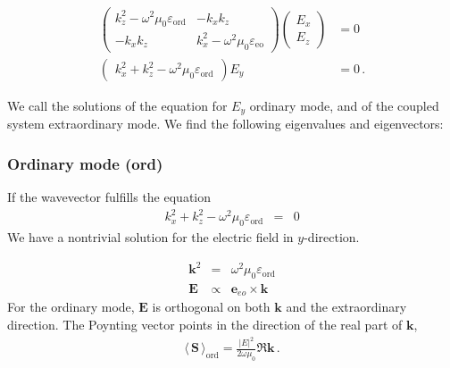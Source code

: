 \documentclass[12pt,a4paper,twoside,openright,BCOR10mm,headsepline,titlepage,abstracton,chapterprefix,final]{scrreprt}
\newcommand\Vector[1]{{\mathbf{#1}}}
\newcommand\vacuum{0}
\newcommand\wavenumber{k}
\newcommand\Wavevector{\Vector{\wavenumber}}
\newcommand\scalarEfield{E}
\newcommand\Efield{\Vector{\scalarEfield}}
\newcommand\vacuumpermeability{\scalarpermeability_{\vacuum}}
\newcommand\scalarpermeability{\mu}
\newcommand\scalarpermittivity{\varepsilon}
\newcommand\ordi{\text{ord}}
\newcommand\eo{\text{eo}}
\newcommand{\timeavg}[1]{{\langle\,#1\,\rangle}}
\begin{document}
\begin{subequations}
\begin{align}
\begin{pmatrix}
 \wavenumber_z^2 - \omega^2 \vacuumpermeability \scalarpermittivity_{\ordi} 
 &
 - \wavenumber_x \wavenumber_z 
 \\
 - \wavenumber_x \wavenumber_z 
 &
 \wavenumber_x^2 - \omega^2 \vacuumpermeability \scalarpermittivity_{\eo}  
\end{pmatrix} 
\begin{pmatrix}
 \scalarEfield_x 
 \\
 \scalarEfield_z
\end{pmatrix}
&= 0
\\
\begin{pmatrix} \wavenumber_x^2 + \wavenumber_z^2 - \omega^2 \vacuumpermeability \scalarpermittivity_{\ordi} \end{pmatrix} \scalarEfield_y &= 0\,.
\end{align}
\end{subequations}

We call the solutions of the equation for $\scalarEfield_y$ ordinary mode, and of the coupled system extraordinary mode.
We find the following eigenvalues and eigenvectors:
\subsubsection{Ordinary mode (ord)}

If the wavevector fulfills the equation
\begin{eqnarray}
  \wavenumber_x^2 + \wavenumber_z^2 - \omega^2 \vacuumpermeability \scalarpermittivity_{\ordi} &=& 0 
\end{eqnarray}
We have a nontrivial solution for the electric field in $y$-direction.

\begin{eqnarray}
 \Wavevector^2 &=& \omega^2 \vacuumpermeability \scalarpermittivity_{\ordi} 
 \\
 \Efield &\propto& \Vector{e}_{eo} \times \Wavevector
\end{eqnarray}
For the ordinary mode, $\Efield$ is orthogonal on both $\Wavevector$ and the extraordinary direction.
The Poynting vector points in the direction of the real part of $\Wavevector$,
\begin{eqnarray}
 \timeavg{\Vector{S}}_\ordi = \frac{ |\scalarEfield|^2 }{ 2\omega\vacuumpermeability } \Re \Wavevector\,.\label{eq:Suniaxialordi}
\end{eqnarray}
\end{document}
